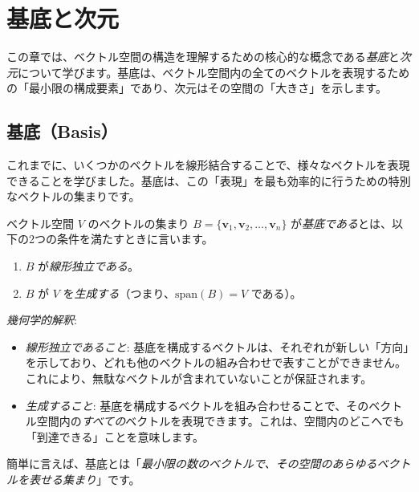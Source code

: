 \section{基底と次元}
この章では、ベクトル空間の構造を理解するための核心的な概念である\emph{基底}と\emph{次元}について学びます。基底は、ベクトル空間内の全てのベクトルを表現するための「最小限の構成要素」であり、次元はその空間の「大きさ」を示します。
\subsection{基底（Basis）}
これまでに、いくつかのベクトルを線形結合することで、様々なベクトルを表現できることを学びました。基底は、この「表現」を最も効率的に行うための特別なベクトルの集まりです。
\begin{dfn}[基底]
ベクトル空間 $V$ のベクトルの集まり $B = \{\bm{v}_1, \bm{v}_2, \ldots, \bm{v}_n\}$ が\emph{基底である}とは、以下の2つの条件を満たすときに言います。
\begin{enumerate}
\item $B$ が\emph{線形独立である}。
\item $B$ が $V$ を\emph{生成する}（つまり、$\text{span}(B) = V$ である）。
\end{enumerate}
\end{dfn}

\emph{幾何学的解釈}:
\begin{itemize}
\item \emph{線形独立であること}: 基底を構成するベクトルは、それぞれが新しい「方向」を示しており、どれも他のベクトルの組み合わせで表すことができません。これにより、無駄なベクトルが含まれていないことが保証されます。
\item \emph{生成すること}: 基底を構成するベクトルを組み合わせることで、そのベクトル空間内の\emph{すべての}ベクトルを表現できます。これは、空間内のどこへでも「到達できる」ことを意味します。
\end{itemize}

簡単に言えば、基底とは「\emph{最小限の数のベクトルで、その空間のあらゆるベクトルを表せる集まり}」です。

